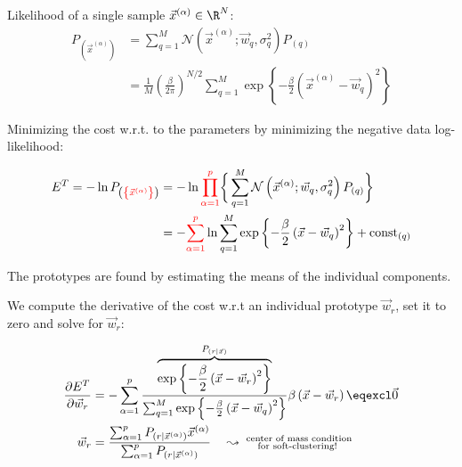 \begin{frame}{\subsecname}


Likelihood of a single sample $\vec x^{(\alpha)} \in \R^N$:
\begin{align}
P_{(\vec{x}^{(\alpha)})} &= \sum_{q=1}^{M} \mathcal{N}\left( \vec{x}^{(\alpha)}; \vec{w}_q, \sigma_q^2 \right) P_{(q)} \\
&= \frac{1}{M}\left(\frac{\beta}{2\pi}\right)^{N/2} \sum_{q=1}^{M} \exp \left\{ - \frac{\beta}{2} \left( \vec{x}^{(\alpha)} - \vec{w}_q \right)^2 \right\} 
\end{align}

Minimizing the cost w.r.t. to the parameters by minimizing the negative data log-likelihood:

\vspace{-2mm}

\begin{align}
E^T = - \ln P_{\left( {\color{red}\left\{ \vec{x}^{(\alpha)} \right\}} \right)} &= -\ln {\color{red}\prod_{\alpha=1}^{p}}
\bigg\{ \sum_{q=1}^{M} \mathcal{N}\left( \vec{x}^{(\alpha)}; \vec{w}_q, \sigma_q^2 \right) P_{(q)}
\bigg\} 
\\&= - {\color{red}\sum_{\alpha=1}^{p}} \ln \sum_{q=1}^{M} \exp \left\{ - \frac{\beta}{2} \left( \vec{x} - \vec{w}_q \right)^2 \right\} + \text{const}_{(q)}
\end{align}

\end{frame}

\begin{frame}{\subsecname}

The prototypes are found by estimating the means of the individual components.

We compute the derivative of the cost w.r.t an individual prototype $\vec w_r$, set it to zero and solve for $\vec w_r$:

\begin{align}
\frac{\partial E^T}{\partial \vec{w}_r} &= - \sum_{\alpha=1}^{p} \frac{\overbrace{\exp \left\{ - \frac{\beta}{2} \left( \vec{x} - \vec{w}_r \right)^2 \right\}}^{P_{(r|\vec x)}}}{\sum_{q=1}^{M} \exp \left\{ - \frac{\beta}{2} \left( \vec{x} - \vec{w}_q \right)^2 \right\}} \beta \left( \vec{x} - \vec{w}_r \right) \eqexcl \vec 0 \\
\vec{w}_r &= \frac{\sum_{\alpha=1}^{p} P_{(r | \vec{x}^{(\alpha)})} \vec{x}^{(\alpha)}}{\sum_{\alpha=1}^{p} P_{(r | \vec{x}^{(\alpha)})}} \quad \leadsto \substack{\text{ center of mass condition}\\\text{for soft-clustering!}}
\end{align}

\end{frame}

